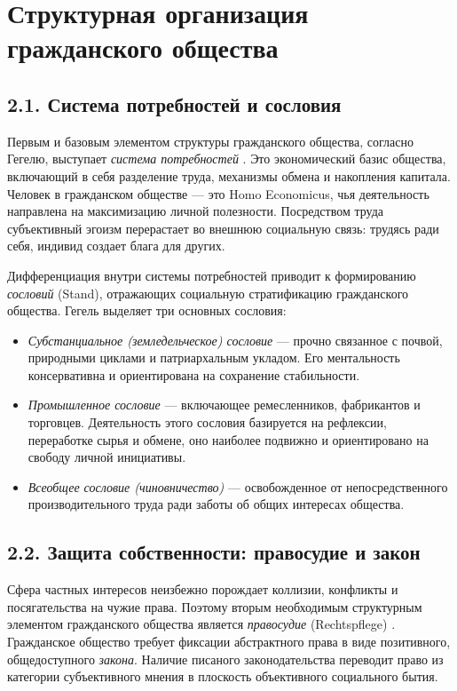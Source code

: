 \section{Структурная организация гражданского общества}

\subsection{2.1. Система потребностей и сословия}
Первым и базовым элементом структуры гражданского общества, согласно Гегелю, выступает \textit{система потребностей} \cite{Hegel}. Это экономический базис общества, включающий в себя разделение труда, механизмы обмена и накопления капитала. Человек в гражданском обществе — это Homo Economicus, чья деятельность направлена на максимизацию личной полезности. Посредством труда субъективный эгоизм перерастает во внешнюю социальную связь: трудясь ради себя, индивид создает блага для других.

Дифференциация внутри системы потребностей приводит к формированию \textit{сословий} (Stand), отражающих социальную стратификацию гражданского общества. Гегель выделяет три основных сословия:
\begin{itemize}
    \item \textit{Субстанциальное (земледельческое) сословие} — прочно связанное с почвой, природными циклами и патриархальным укладом. Его ментальность консервативна и ориентирована на сохранение стабильности.
    \item \textit{Промышленное сословие} — включающее ремесленников, фабрикантов и торговцев. Деятельность этого сословия базируется на рефлексии, переработке сырья и обмене, оно наиболее подвижно и ориентировано на свободу личной инициативы.
    \item \textit{Всеобщее сословие (чиновничество)} — освобожденное от непосредственного производительного труда ради заботы об общих интересах общества.
\end{itemize}

\subsection{2.2. Защита собственности: правосудие и закон}
Сфера частных интересов неизбежно порождает коллизии, конфликты и посягательства на чужие права. Поэтому вторым необходимым структурным элементом гражданского общества является \textit{правосудие} (Rechtspflege) \cite{Hegel}. Гражданское общество требует фиксации абстрактного права в виде позитивного, общедоступного \textit{закона}. Наличие писаного законодательства переводит право из категории субъективного мнения в плоскость объективного социального бытия.

